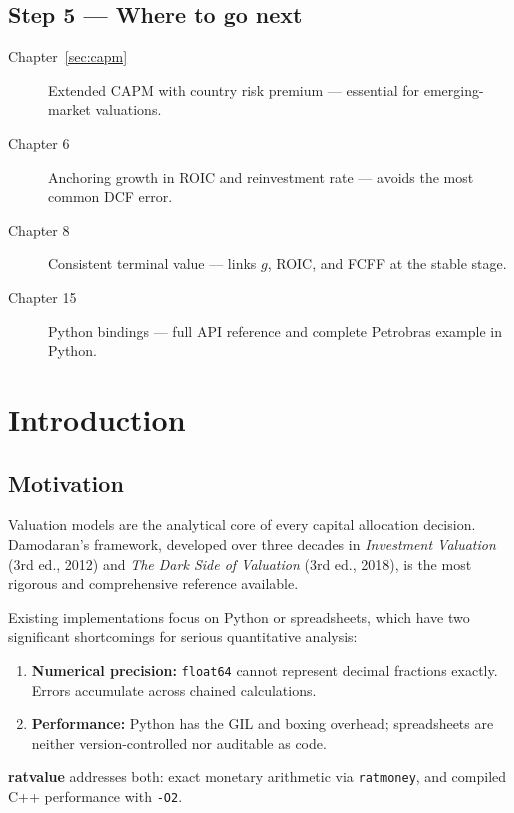 \documentclass[12pt, a4paper, oneside]{book}
\begin{document}
\section*{Step 5 --- Where to go next}

\begin{description}
  \item[Chapter~\ref{sec:capm}] Extended CAPM with country risk premium ---
       essential for emerging-market valuations.
  \item[Chapter 6] Anchoring growth in ROIC and reinvestment rate ---
       avoids the most common DCF error.
  \item[Chapter 8] Consistent terminal value --- links $g$, ROIC, and FCFF
       at the stable stage.
  \item[Chapter 15] Python bindings --- full API reference and complete
       Petrobras example in Python.
\end{description}

\chapter{Introduction}

\section{Motivation}

Valuation models are the analytical core of every capital allocation decision.
Damodaran's framework, developed over three decades in \textit{Investment
Valuation} (3rd ed., 2012) and \textit{The Dark Side of Valuation} (3rd ed.,
2018), is the most rigorous and comprehensive reference available.

Existing implementations focus on Python or spreadsheets, which have two
significant shortcomings for serious quantitative analysis:

\begin{enumerate}
  \item \textbf{Numerical precision:} \texttt{float64} cannot represent decimal
        fractions exactly. Errors accumulate across chained calculations.
  \item \textbf{Performance:} Python has the GIL and boxing overhead;
        spreadsheets are neither version-controlled nor auditable as code.
\end{enumerate}

\textbf{ratvalue} addresses both: exact monetary arithmetic via
\texttt{ratmoney}, and compiled C++ performance with \texttt{-O2}.
\end{document}
